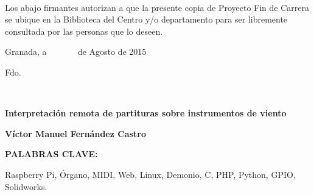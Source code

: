 ~

\cleardoublepage
{}
\thispagestyle{empty}


\noindent Los abajo firmantes autorizan a que la presente copia de
Proyecto Fin de Carrera se ubique en la Biblioteca del Centro y/o
departamento para ser libremente consultada por las personas que lo
deseen.

\vspace*{1cm}

\begin{center}
Granada, a ~~~~~~ de Agosto de 2015
\par\end{center}

\bigskip%
\bigskip%
\begin{doublespace}
\hspace{4cm}Fdo.
\end{doublespace}

\newpage
\thispagestyle{empty}

~

\cleardoublepage
{}
\thispagestyle{empty}

\begin{center}
\textbf{\Large Interpretación remota de partituras sobre instrumentos de viento}
\par\end{center}{\Large \par}

\begin{center}
\textbf{\large Víctor Manuel Fernández Castro}
\par\end{center}{\large \par}

\vspace{0.75cm}






\begin{doublespace}
\noindent \textbf{PALABRAS CLAVE:}
\end{doublespace}



\begin{singlespace}
\noindent Raspberry Pi, Órgano, MIDI, Web, Linux, Demonio, C, PHP, Python, GPIO, Solidworks.

\end{singlespace}


